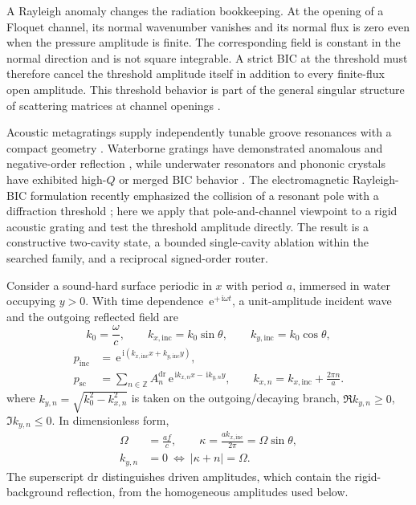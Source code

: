 \documentclass[aps,prl,reprint,superscriptaddress,nofootinbib]{revtex4-2}
\newcommand{\ii}{\,\mathrm{i}}
\newcommand{\e}{\,\mathrm{e}}
\providecommand{\dr}{\mathrm{dr}}
\providecommand{\inc}{\mathrm{inc}}
\begin{document}
A Rayleigh anomaly changes the radiation bookkeeping.  At the opening of a Floquet channel, its normal wavenumber vanishes and its normal flux is zero even when the pressure amplitude is finite.  The corresponding field is constant in the normal direction and is not square integrable.  A strict BIC at the threshold must therefore cancel the threshold amplitude itself in addition to every finite-flux open amplitude.  This threshold behavior is part of the general singular structure of scattering matrices at channel openings \cite{Rayleigh1907,Wojcik2021ThresholdScattering}.

Acoustic metagratings supply independently tunable groove resonances with a compact geometry \cite{Assouar2018AcousticMetasurfaces,Ni2019Splitter,Torrent2018Anomalous,Jin2019Grating}.  Waterborne gratings have demonstrated anomalous and negative-order reflection \cite{Bernard2022NegativeReflection,Fan2021Multifunctional,Cao2024UnderwaterAbnormal}, while underwater resonators and phononic crystals have exhibited high-$Q$ or merged BIC behavior \cite{Farhat2024UltrahighQ,Yang2024MergedFP}.  The electromagnetic Rayleigh-BIC formulation recently emphasized the collision of a resonant pole with a diffraction threshold \cite{Karavaev2026Rayleigh}; here we apply that pole-and-channel viewpoint to a rigid acoustic grating and test the threshold amplitude directly.  The result is a constructive two-cavity state, a bounded single-cavity ablation within the searched family, and a reciprocal signed-order router.

Consider a sound-hard surface periodic in $x$ with period $a$, immersed in water occupying $y>0$.  With time dependence $\e^{+\ii\omega t}$, a unit-amplitude incident wave and the outgoing reflected field are
\begin{equation}
 k_0=\frac{\omega}{c},\qquad k_{x,\inc}=k_0\sin\theta,\qquad
 k_{y,\inc}=k_0\cos\theta,
 \label{eq:incident-wavenumbers}
\end{equation}
\begin{equation}
\begin{aligned}
 p_{\inc}&=\e^{\ii(k_{x,\inc}x+k_{y,\inc}y)},\\
 p_{\mathrm{sc}}&=\sum_{n\in\mathbb Z}A_n^{\dr}
 \e^{\ii k_{x,n}x-\ii k_{y,n}y},\qquad
 k_{x,n}=k_{x,\inc}+\frac{2\pi n}{a}.
\end{aligned}
\label{eq:floquet-expansion}
\end{equation}
where $k_{y,n}=\sqrt{k_0^2-k_{x,n}^2}$ is taken on the outgoing/decaying branch, $\Re k_{y,n}\geq0$, $\Im k_{y,n}\leq0$.  In dimensionless form,
\begin{equation}
\begin{aligned}
 \Omega&=\frac{af}{c},\qquad
 \kappa=\frac{ak_{x,\inc}}{2\pi}=\Omega\sin\theta,\\
 k_{y,n}&=0\ \Longleftrightarrow\ |\kappa+n|=\Omega .
\end{aligned}
\label{eq:rayleigh-condition}
\end{equation}
The superscript $\dr$ distinguishes driven amplitudes, which contain the rigid-background reflection, from the homogeneous amplitudes used below.
\end{document}
